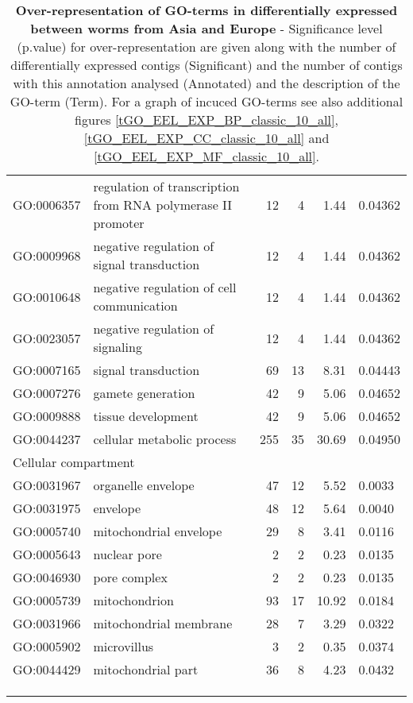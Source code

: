 \begin{longtable}{lp{4.5cm}rrrl}
  GO:0006357 & regulation of transcription from RNA polymerase II promoter &  12 &   4 & 1.44 & 0.04362 \\ 
  GO:0009968 & negative regulation of signal transduction &  12 &   4 & 1.44 & 0.04362 \\ 
  GO:0010648 & negative regulation of cell communication &  12 &   4 & 1.44 & 0.04362 \\ 
  GO:0023057 & negative regulation of signaling &  12 &   4 & 1.44 & 0.04362 \\ 
  GO:0007165 & signal transduction &  69 &  13 & 8.31 & 0.04443 \\ 
  GO:0007276 & gamete generation &  42 &   9 & 5.06 & 0.04652 \\ 
  GO:0009888 & tissue development &  42 &   9 & 5.06 & 0.04652 \\ 
  GO:0044237 & cellular metabolic process & 255 &  35 & 30.69 & 0.04950 \\ 
   \hline
   \multicolumn{6}{l}{Cellular compartment}  \\ 
GO:0031967 & organelle envelope &  47 &  12 & 5.52 & 0.0033 \\ 
  GO:0031975 & envelope &  48 &  12 & 5.64 & 0.0040 \\ 
  GO:0005740 & mitochondrial envelope &  29 &   8 & 3.41 & 0.0116 \\ 
  GO:0005643 & nuclear pore &   2 &   2 & 0.23 & 0.0135 \\ 
  GO:0046930 & pore complex &   2 &   2 & 0.23 & 0.0135 \\ 
  GO:0005739 & mitochondrion &  93 &  17 & 10.92 & 0.0184 \\ 
  GO:0031966 & mitochondrial membrane &  28 &   7 & 3.29 & 0.0322 \\ 
  GO:0005902 & microvillus &   3 &   2 & 0.35 & 0.0374 \\ 
  GO:0044429 & mitochondrial part &  36 &   8 & 4.23 & 0.0432 \\ 
   \hline\\
   \caption[Over-representation of GO-terms in differentially
   expressed between worms from Asia and Europe
   ]{\textbf{Over-representation of GO-terms in differentially
       expressed between worms from Asia and Europe} - Significance
     level (p.value) for over-representation are given along with the
     number of differentially expressed contigs (Significant) and the
     number of contigs with this annotation analysed (Annotated) and
     the description of the GO-term (Term). For a graph of incuced
     GO-terms see also additional figures
     \ref{tGO_EEL_EXP_BP_classic_10_all},
     \ref{tGO_EEL_EXP_CC_classic_10_all} and
     \ref{tGO_EEL_EXP_MF_classic_10_all}.}\\
   \label{over-de-ae-454}
\end{longtable}

